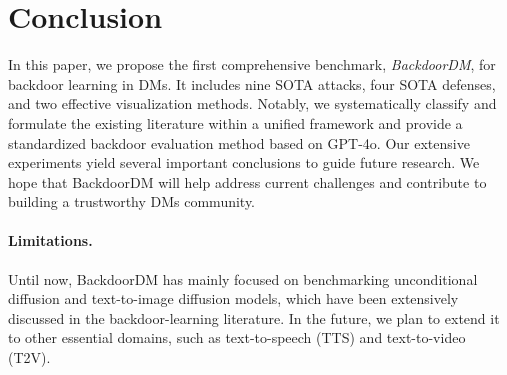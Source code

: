 \section{Conclusion}
\label{sec:conclusion}

In this paper, we propose the first comprehensive benchmark, \textit{BackdoorDM}, for backdoor learning in DMs. It includes nine SOTA attacks, four SOTA defenses, and two effective visualization methods. 
Notably, we systematically classify and formulate the existing literature within a unified framework and provide a standardized backdoor evaluation method based on GPT-4o. Our extensive experiments yield several important conclusions to guide future research. We hope that BackdoorDM will help address current challenges and contribute to building a trustworthy DMs community.

\paragraph{Limitations.}
Until now, BackdoorDM has mainly focused on benchmarking unconditional diffusion and text-to-image diffusion models, which have been extensively discussed in the backdoor-learning literature. In the future, we plan to extend it to other essential domains, such as text-to-speech (TTS) and text-to-video (T2V).

